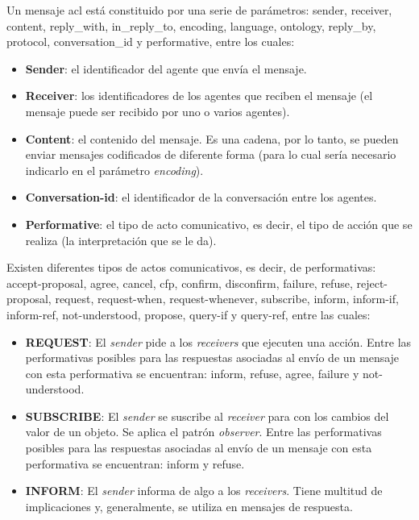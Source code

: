 Un mensaje \acrshort{acl} está constituido por una serie de parámetros: sender, receiver, content, reply\_with, in\_reply\_to, encoding, language, ontology, reply\_by, protocol, conversation\_id y performative,  \cite{fipa, dba2122} entre los cuales:
\begin{itemize}
    \item \textbf{Sender}: el identificador del agente que envía el mensaje.
    \item \textbf{Receiver}: los identificadores de los agentes que reciben el mensaje (el mensaje puede ser recibido por uno o varios agentes).
    \item \textbf{Content}: el contenido del mensaje. Es una cadena, por lo tanto, se pueden enviar mensajes codificados de diferente forma (para lo cual sería necesario indicarlo en el parámetro \textit{encoding}).
    \item \textbf{Conversation-id}: el identificador de la conversación entre los agentes.
    \item \textbf{Performative}: el tipo de acto comunicativo, es decir, el tipo de acción que se realiza (la interpretación que se le da).
\end{itemize}
 Existen diferentes tipos de actos comunicativos, es decir, de performativas: accept-proposal, agree, cancel, cfp, confirm, disconfirm, failure, refuse, reject-proposal, request, request-when, request-whenever, subscribe, inform, inform-if, inform-ref, not-understood, propose, query-if y query-ref, \cite{fipa, dba2122} entre las cuales:
 \begin{itemize}
     \item \textbf{REQUEST}: El \textit{sender} pide a los \textit{receivers} que ejecuten una acción. Entre las performativas posibles para las respuestas asociadas al envío de un mensaje con esta performativa se encuentran: inform, refuse, agree, failure y not-understood.
     \item \textbf{SUBSCRIBE}: El \textit{sender} se suscribe al \textit{receiver} para con los cambios del valor de un objeto. Se aplica el patrón \textit{observer}. Entre las performativas posibles para las respuestas asociadas al envío de un mensaje con esta performativa se encuentran: inform y refuse.
     \item \textbf{INFORM}: El \textit{sender} informa de algo a los \textit{receivers}. Tiene multitud de implicaciones y, generalmente, se utiliza en mensajes de respuesta.
 \end{itemize}

\newpage
